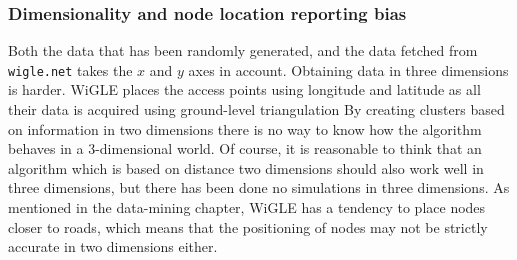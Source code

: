 \subsubsection{Dimensionality and node location reporting bias} 
Both the data that has been randomly generated, and the data fetched from \verb|wigle.net| takes the $x$ and $y$ axes in account. Obtaining data in three dimensions is harder.
WiGLE places the access points using longitude and latitude as all their data is acquired using ground-level triangulation
By creating clusters based on information in two dimensions there is no way to know how the algorithm behaves in a 3-dimensional world. Of course, it is reasonable to think that an algorithm
which is based on distance two dimensions should also work well in three dimensions, but there has been done no simulations in three dimensions. As mentioned in the data-mining chapter, WiGLE has a 
tendency to place nodes closer to roads, which means that the positioning of nodes may not be strictly accurate in two dimensions either.  



